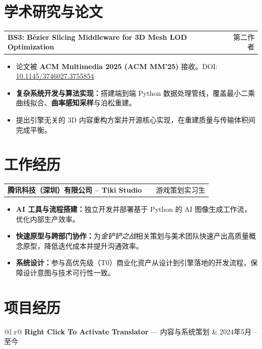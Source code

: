 \documentclass[a4paper,12pt]{article}
\makeatletter
\newenvironment{joblong}[2]
  {
    \begin{tabularx}{\linewidth}{@{}l X r@{}}
      \textbf{#1} & \hfill & #2 \\[3.75pt]
    \end{tabularx}
    \begin{minipage}[t]{\linewidth}
    \begin{itemize}[nosep,after=\strut,leftmargin=1em,itemsep=3pt,label=--]
  }
  {
    \end{itemize}
    \end{minipage}
  }
\makeatother
\begin{document}
\section{学术研究与论文}

\begin{joblong}{BS3: B\'ezier Slicing Middleware for 3D Mesh LOD Optimization}{第二作者}
  \item 论文被 \textbf{ACM Multimedia 2025 (ACM MM'25)} 接收。DOI: \href{https://doi.org/10.1145/3746027.3755854}{10.1145/3746027.3755854}
  \item \textbf{复杂系统开发与算法实现：}搭建端到端 Python 数据处理管线，覆盖最小二乘曲线拟合、\textbf{曲率感知采样}与泊松重建。
  \item 提出引擎无关的 3D 内容重构方案并开源核心实现，在重建质量与传输体积间完成平衡。
\end{joblong}

\section{工作经历}

\begin{joblong}{腾讯科技（深圳）有限公司 -- Tiki Studio}{游戏策划实习生}
  \item \textbf{AI 工具与流程搭建：}独立开发并部署基于 Python 的 AI 图像生成工作流，优化内部生产效率。
  \item \textbf{快速原型与跨部门协作：}为\textit{金铲铲之战}相关策划与美术团队快速产出高质量概念原型，降低迭代成本并提升沟通效率。
  \item \textbf{系统设计：}参与高优先级（T0）商业化资产从设计到引擎落地的开发流程，保障设计意图与技术可行性一致。
\end{joblong}

\section{项目经历}

\begin{tabularx}{\linewidth}{@{}l r@{}}
\textbf{Right Click To Activate Translator} --- 内容与系统策划 & \hfill 2024年5月 -- 至今 \\
\\
\end{tabularx}
\end{document}

